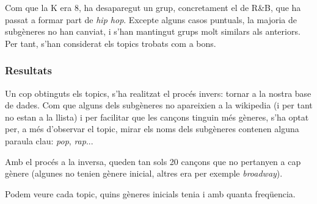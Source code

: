 Com que la K era 8, ha desaparegut un grup, concretament el de R\&B, que ha passat a formar part de \textit{hip hop}. Excepte alguns casos puntuals, la majoria de subgèneres no han canviat, i s'han mantingut grups molt similars als anteriors. Per tant, s'han considerat els topics trobats com a bons.

\subsubsection{Resultats}
Un cop obtinguts els topics, s'ha realitzat el procés invers: tornar a la nostra base de dades. Com que alguns dels subgèneres no apareixien a la wikipedia (i per tant no estan a la llista) i per facilitar que les cançons tinguin més gèneres, s'ha optat per, a més d'observar el topic, mirar els noms dels subgèneres contenen alguna paraula clau: \textit{pop}, \textit{rap}...

Amb el procés a la inversa, queden tan sols 20 cançons que no pertanyen a cap gènere (algunes no tenien gènere inicial, altres era per exemple \textit{broadway}).

Podem veure cada topic, quins gèneres inicials tenia i amb quanta freqüencia.

